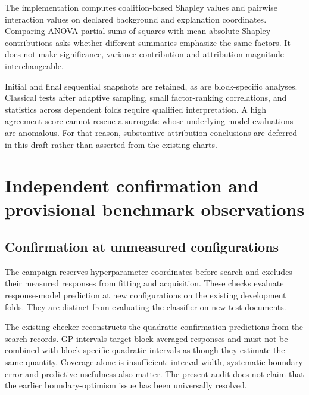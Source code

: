 \documentclass[12pt,a4paper]{article}
\begin{document}
The implementation computes coalition-based Shapley values and pairwise interaction values on declared background and explanation coordinates. Comparing ANOVA partial sums of squares with mean absolute Shapley contributions asks whether different summaries emphasize the same factors. It does not make significance, variance contribution and attribution magnitude interchangeable.

Initial and final sequential snapshots are retained, as are block-specific analyses. Classical tests after adaptive sampling, small factor-ranking correlations, and statistics across dependent folds require qualified interpretation. A high agreement score cannot rescue a surrogate whose underlying model evaluations are anomalous. For that reason, substantive attribution conclusions are deferred in this draft rather than asserted from the existing charts.

\section{Independent confirmation and provisional benchmark observations}
\subsection{Confirmation at unmeasured configurations}
The campaign reserves hyperparameter coordinates before search and excludes their measured responses from fitting and acquisition. These checks evaluate response-model prediction at new configurations on the existing development folds. They are distinct from evaluating the classifier on new test documents.

\begin{table}[htbp]\centering

\caption{Reconstructed quadratic-surrogate confirmation diagnostics for classification loss. Bias is observed minus predicted loss. Interval coverage is empirical coverage under the fitted fixed-block model; dependence and the unresolved training anomaly limit its interpretation.}
\end{table}

The existing checker reconstructs the quadratic confirmation predictions from the search records. GP intervals target block-averaged responses and must not be combined with block-specific quadratic intervals as though they estimate the same quantity. Coverage alone is insufficient: interval width, systematic boundary error and predictive usefulness also matter. The present audit does not claim that the earlier boundary-optimism issue has been universally resolved.
\end{document}
